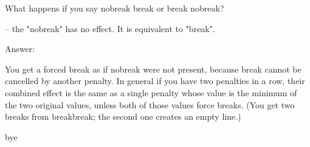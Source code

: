 What happens if you say  nobreak break or  break nobreak?

-- the "nobreak" has no effect. It is equivalent to "break".

Answer:

You get a forced break as if nobreak were not present, because break cannot
be cancelled by another penalty. In general if you have two penalties in a row, their
combined effect is the same as a single penalty whose value is the minimum of the two
original values, unless both of those values force breaks. (You get two breaks from
breakbreak; the second one creates an empty line.)

bye

